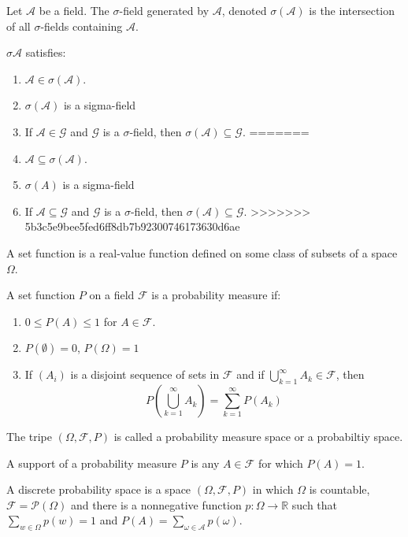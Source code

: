 \documentclass[12pt]{article}
\newcommand{\R}{\mathbb{R}}
\newcommand{\F}{\mathcal{F}}
\newcommand{\A}{\mathcal{A}}
\newcommand{\seq}{\subseteq}
\newcommand{\es}{\emptyset}
\newcommand{\mc}{\mathcal}
\newenvironment{defn}[2][Definition]{\begin{trivlist}
\item[\hskip \labelsep {\bfseries #1}\hskip \labelsep {\bfseries #2.}]}{\end{trivlist}}
\newenvironment{rmrk}[2][Remark]{\begin{trivlist}
\item[\hskip \labelsep {\bfseries #1}\hskip \labelsep {\bfseries #2.}]}{\end{trivlist}}
\begin{document}
\begin{defn}{2}
    Let $\mc A$ be a field. The $\sigma$-field generated by $\mc A$, denoted $\sigma (\mc A)$ is the intersection of all $\sigma$-fields containing $\mc A$.
\end{defn}

\begin{rmrk}{3}
    $\sigma \mc A$ satisfies:
    \begin{enumerate}
<<<<<<< HEAD
        \item $\A \in \sigma(\A)$.
        \item $\sigma(\A)$ is a sigma-field
        \item If $\A \in \mc G$ and $\mc G$ is a $\sigma$-field, then $\sigma(\A) \seq \mc G$.
=======
        \item $\A \seq \sigma(\A)$.
        \item $\sigma(A)$ is a sigma-field
        \item If $\A \seq \mc G$ and $\mc G$ is a $\sigma$-field, then $\sigma (\A) \seq \mc G$.
>>>>>>> 5b3c5e9bee5fed6ff8db7b92300746173630d6ae
    \end{enumerate}
\end{rmrk}


\begin{defn}{4}
    A set function is a real-value function defined on some class of subsets of a space $\Omega$.
\end{defn}

\begin{defn}{5}
    A set function $P$ on a field $\F$ is a probability measure if:
    \begin{enumerate}
        \item $0 \leq P(A) \leq 1$ for $A \in \mc F$.
        \item $P(\es) = 0$, $P(\Omega) = 1$
        \item If $(A_i)$ is a disjoint sequence of sets in $\F$ and if $\bigcup_{k=1}^{\infty} A_k \in \F$, then
        \[ P \left ( \bigcup_{k=1}^{\infty} A_k \right) = \sum_{k=1}^{\infty} P(A_k) \]
    \end{enumerate}
    The tripe $(\Omega, \F, P)$ is called a probability measure space or a probabiltiy space.
\end{defn}

\begin{defn}{6}
    A support of a probability measure $P$ is any $A \in \F$ for which $P(A) = 1$.
\end{defn}

\begin{defn}{9}
    A discrete probability space is a space $(\Omega, \F, P)$ in which $\Omega$ is countable, $\F = \mc P (\Omega)$ and there is a nonnegative function $p: \Omega \to \R$ such that $\sum_{w \in \Omega} p(w) = 1$ and $P(A) = \sum_{\omega \in \A} p(\omega)$.
\end{defn}
\end{document}
